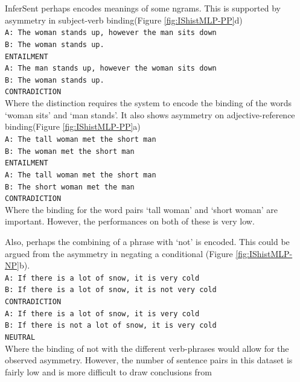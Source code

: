 \documentclass[10pt,letterpaper]{article}
\begin{document}
InferSent perhaps encodes meanings of some ngrams. This is supported by asymmetry in subject-verb binding(Figure \ref{fig:IShistMLP-PP}d) \\
{\tt A: The woman stands up, however the man sits down \\ B: The woman stands up. \\ ENTAILMENT \\}{\tt A: The man stands up, however the woman sits down \\ B: The woman stands up. \\ CONTRADICTION}\\
Where the distinction requires the system to encode the binding of the words `woman sits' and `man stands'. It also shows asymmetry on adjective-reference binding(Figure \ref{fig:IShistMLP-PP}a)\\
{\tt A: The tall woman met the short man \\ B: The woman met the short man \\ ENTAILMENT \\}{\tt A: The tall woman met the short man \\ B: The short woman met the man \\ CONTRADICTION}\\
Where the binding for the word pairs `tall woman' and `short woman' are important. However, the performances on both of these is very low.

Also, perhaps the combining of a phrase with `not' is encoded. This could be argued from the asymmetry in negating a conditional (Figure \ref{fig:IShistMLP-NP}b).
\\
{\tt A: If there is a lot of snow, it is very cold \\ B: If there is a lot of snow, it is not very cold \\ CONTRADICTION \\}{\tt A: If there is a lot of snow, it is very cold \\ B: If there is not a lot of snow, it is very cold \\ NEUTRAL}\\
Where the binding of not with the different verb-phrases would allow for the observed asymmetry. However, the number of sentence pairs in this dataset is fairly low and is more difficult to draw conclusions from  %
\end{document}
